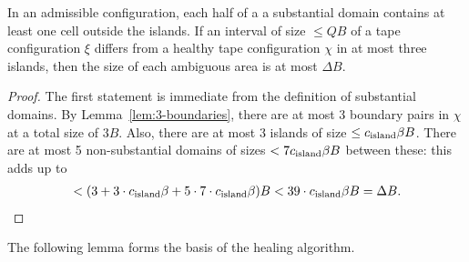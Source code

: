 \documentclass[11pt]{memoir}
\theoremstyle{definition} %
\renewcommand{\le}{\leq}
\def\B{B}
\newcommand{\Q}{Q} %
\newcommand{\cns}[1]{c_{\textrm{\upshape #1}}}
\begin{document}
\begin{lemma}\label{lem:ambiguous}
In an admissible configuration, each half of a 
a substantial domain contains at least one cell outside the islands.
If an interval of size \( \le  \Q\B \) of a tape configuration \( \xi \) differs from a  healthy tape 
configuration \( \chi \) in at most three islands, then 
the size of each ambiguous area is at most \( \Delta\B \).
\end{lemma}
\begin{proof}
The first statement is immediate from the definition of substantial domains.
By Lemma~\ref{lem:3-boundaries},
there are at most 3 boundary pairs in \( \chi \) at a total size of \( 3\B \).
Also, there are at most 3 islands of size \( \le\cns{island}\beta\B \).
There are at most 5 non-substantial domains of sizes \( < 7\cns{island}\beta\B \)
between these: this adds up to
\begin{align*}
 < (3+3\cdot\cns{island}\beta+ 5\cdot 7\cdot\cns{island}\beta)\B<39\cdot\cns{island}\beta\B=\Delta\B.
 \end{align*}
\end{proof}

The following lemma forms the basis of the healing algorithm.
\end{document}
